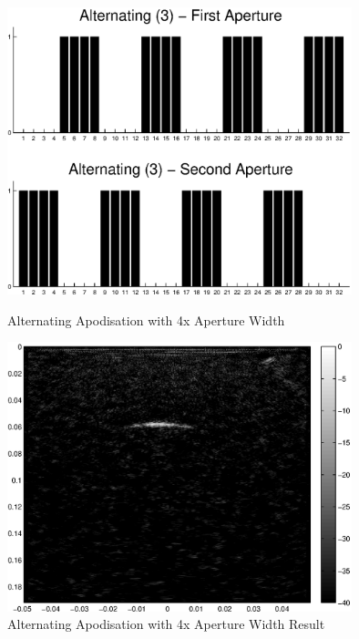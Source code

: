\begin{figure}[htbp]
\centering
		\includegraphics[width=100mm]{Alternating3.eps}
		\caption{Alternating Apodisation with 4x Aperture Width}
		\label{fig:apod4}

		\includegraphics[width=100mm]{04_SAC.eps}
		\caption{Alternating Apodisation with 4x Aperture Width Result}
		\label{fig:apod4_result}
\end{figure}

